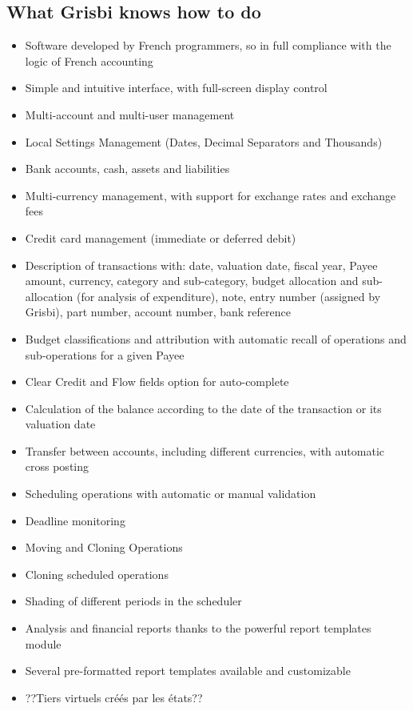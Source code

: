 \subsection{What Grisbi knows how to do}

\begin{itemize}
	\item Software developed by French programmers, so in full compliance with the logic of French accounting
	\item Simple and intuitive interface, with full-screen display control
	\item Multi-account and multi-user management
	\item Local Settings Management (Dates, Decimal Separators and Thousands)
	\item Bank accounts, cash, assets and liabilities
	\item Multi-currency management, with support for exchange rates and exchange fees
	\item Credit card management (immediate or deferred debit)
	\item Description of transactions with: date, valuation date, fiscal year, Payee amount, currency, category and sub-category, budget allocation and sub-allocation (for analysis of expenditure), note, entry number (assigned by Grisbi), part number, account number, bank reference
	\item Budget classifications and attribution with automatic recall of operations and sub-operations for a given Payee
	\item Clear Credit and Flow fields option for auto-complete
	\item Calculation of the balance according to the date of the transaction or its valuation date
	\item Transfer between accounts, including different currencies, with automatic cross posting
	\item Scheduling operations with automatic or manual validation
	\item Deadline monitoring
	\item Moving and Cloning Operations
	\item Cloning scheduled operations
	\item Shading of different periods in the scheduler
	\item Analysis and financial reports thanks to the powerful report templates module
	\item Several pre-formatted report templates available and customizable
	\item ??Tiers virtuels créés par les états??

\end{itemize}
